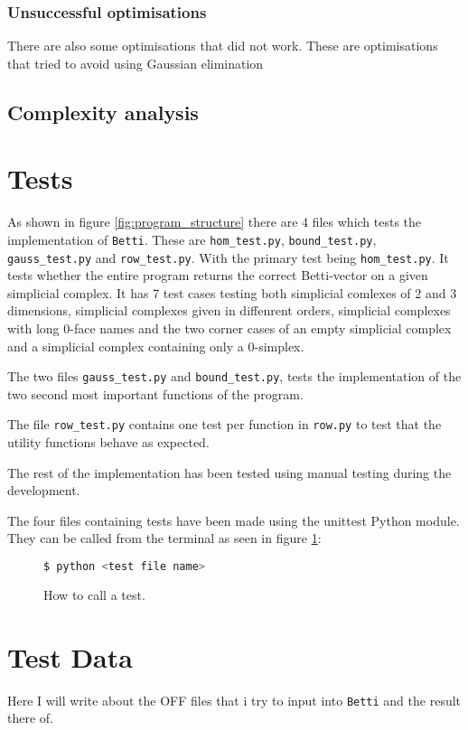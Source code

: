 \documentclass[11pt,a4paper,twoside]{report}
\begin{document}
\subsubsection{Unsuccessful optimisations}
There are also some optimisations that did not work. These are optimisations that tried to avoid using Gaussian elimination
\subsection{Complexity analysis}

\section{Tests}
As shown in figure \ref{fig:program_structure} there are 4 files which tests the implementation of \texttt{Betti}. These are \texttt{hom\_test.py}, \texttt{bound\_test.py}, \texttt{gauss\_test.py} and \texttt{row\_test.py}. With the primary test being \texttt{hom\_test.py}. It tests whether the entire program returns the correct Betti-vector on a given simplicial complex. It has 7 test cases testing both simplicial comlexes of 2 and 3 dimensions, simplicial complexes given in diffenrent orders, simplicial complexes with long 0-face names and the two corner cases of an empty simplicial complex and a simplicial complex containing only a 0-simplex. 

The two files \texttt{gauss\_test.py} and \texttt{bound\_test.py}, tests the implementation of the two second most important functions of the program.

The file \texttt{row\_test.py} contains one test per function in \texttt{row.py} to test that the utility functions behave as expected.

The rest of the implementation has been tested using manual testing during the development. 

The four files containing tests have been made using the unittest Python module. They can be called from the terminal as seen in figure \ref{fig:how2test}:
\begin{figure}
\begin{lstlisting}[language=bash]
$ python <test file name>
\end{lstlisting}
\caption{How to call a test.}
\label{fig:how2test}
\end{figure}

\section{Test Data}
Here I will write about the OFF files that i try to input into \texttt{Betti} and the result there of.
\newpage
\end{document}
